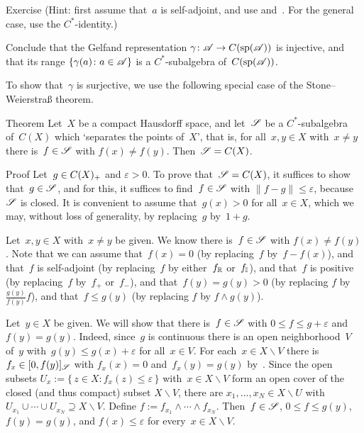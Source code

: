 \documentclass[a]{subfiles}
\begin{document}
\begin{parsec}
\begin{point}{Exercise}
(Hint: first assume that~$a$ is self-adjoint,
and use  and~.
For the general case,
use the $C^*$-identity.)

Conclude that the Gelfand representation $\gamma\colon \mathscr{A}\to C(\mathrm{sp}(\mathscr{A}))$
is injective,
and that its range $\{\gamma(a)\colon a\in\mathscr{A}\}$
is a $C^*$-subalgebra of~$C(\mathrm{sp}(\mathscr{A}))$.
\end{point}
\begin{point}%
To show that~$\gamma$ is surjective,
we use the following special case of
the Stone--Weierstra\ss{} theorem.%
\end{point}
\begin{point}{Theorem}%
Let~$X$ be a compact Hausdorff space,
and let~$\mathscr{S}$ be a $C^*$-subalgebra of~$C(X)$
which `separates the points of~$X$',
that is, for all~$x,y\in X$ with~$x\neq y$
there is~$f\in \mathscr{S}$ with $f(x)\neq f(y)$.
Then~$\mathscr{S}=C(X)$.
\begin{point}{Proof}%
Let~$g\in C(X)_{+}$ and $\varepsilon >0$.
To prove that~$\mathscr{S}=C(X)$,
it suffices to show that~$g\in \mathscr{S}$,
and for this,
it suffices to find~$f\in \mathscr{S}$ with $\|f-g\|\leq \varepsilon$,
because~$\mathscr{S}$ is closed.
It is convenient to assume that~$g(x)> 0$ for all~$x\in X$,
which we may, without loss of generality,
by replacing~$g$ by~$1+g$.

\begin{point}%
Let~$x,y\in X$ with~$x\neq y$
be given.
We know there is~$f\in \mathscr{S}$ with $f(x)\neq f(y)$.
Note that we can assume that~$f(x)=0$ (by replacing~$f$ by~$f-f(x)$),
and that~$f$ is self-adjoint (by replacing~$f$
by either~$f_{\mathbb{R}}$ or~$f_{\mathbb{I}}$),
and that~$f$ is positive
(by replacing~$f$ by~$f_+$ or~$f_-$),
and that~$f(y)=g(y)>0$
(by replacing $f$ by $\frac{g(y)}{f(y)} f$),
and that~$f\leq g(y)$
(by replacing $f$ by $f\wedge g(y)$).
\end{point}
\begin{point}%
Let~$y\in X$ be given.
We will show that there is~$f\in\mathscr{S}$
with $0\leq f\leq g+\varepsilon$
and~$f(y)=g(y)$.
Indeed,
since~$g$ is continuous
there is an open neighborhood~$V$ of~$y$
with~$g(y) \leq  g(x)+\varepsilon$
for all~$x\in V$.
For each~$x\in X\backslash V$ there is $f_x \in [0,f(y)]_{\mathscr{S}}$
with $f_x(x)=0$ and~$f_x(y)=g(y)$ by~.
Since the open subsets
$U_x := \{\,z\in X\colon f_x(z)\leq \varepsilon\,\}$
with~$x\in X\backslash V$
form an open cover of the closed (and thus compact) subset $X\backslash V$,
there are $x_1,\dotsc,x_N\in X\backslash U$
with $U_{x_1}\cup\dotsb\cup U_{x_N}\supseteq X\backslash V$.
Define $f:=f_{x_1}\wedge \dotsb \wedge f_{x_N}$.
Then~$f\in \mathscr{S}$, $0\leq f\leq g(y)$, $f(y)=g(y)$,
and $f(x)\leq \varepsilon$
for every~$x\in X\backslash V$.


\end{point}
\end{point}
\end{point}
\end{parsec}
\end{document}
